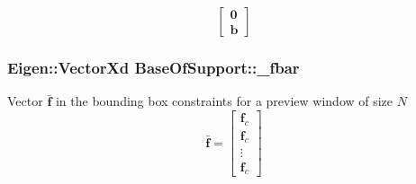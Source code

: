 \[ \left[ \begin{array}{c} \mathbf{0}\\ \mathbf{b} \end{array}\right] \] \hypertarget{classBaseOfSupport_aa578314a7473867f545b95883beb6c6b}{
\subsubsection[{\-\_\-fbar}]{\setlength{\rightskip}{0pt plus 5cm}\-Eigen\-::\-Vector\-Xd {\bf \-Base\-Of\-Support\-::\-\_\-fbar}}}\label{classBaseOfSupport_aa578314a7473867f545b95883beb6c6b}
\-Vector $\bar{\mathbf{f}}$ in the bounding box constraints for a preview window of size $N$ \[ \bar{\mathbf{f}} = \left[\begin{array}{c} \mathbf{f}_c\\ \mathbf{f}_c\\ \vdots\\ \mathbf{f}_c \end{array}\right] \]


